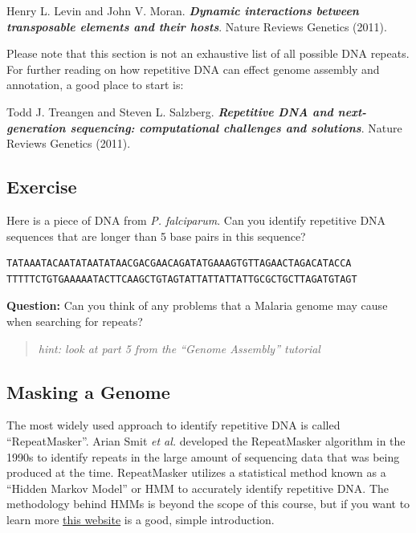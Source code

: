 \documentclass[11pt]{article}
\begin{document}
Henry L. Levin and John V. Moran. \textit{\textbf{Dynamic interactions
between transposable elements and their hosts}}. Nature Reviews Genetics
(2011).

Please note that this section is not an exhaustive list of all possible
DNA repeats. For further reading on how repetitive DNA can effect genome
assembly and annotation, a good place to start is:

Todd J. Treangen and Steven L. Salzberg. \textit{\textbf{Repetitive DNA
and next-generation sequencing: computational challenges and
solutions}}. Nature Reviews Genetics (2011).

    \hypertarget{exercise}{%
\subsection{Exercise}\label{exercise}}

Here is a piece of DNA from \textit{P. falciparum}. Can you identify
repetitive DNA sequences that are longer than 5 base pairs in this
sequence?

\begin{verbatim}
TATAAATACAATATAATATAACGACGAACAGATATGAAAGTGTTAGAACTAGACATACCA
TTTTTCTGTGAAAAATACTTCAAGCTGTAGTATTATTATTATTGCGCTGCTTAGATGTAGT
\end{verbatim}

\textbf{Question:} Can you think of any problems that a Malaria genome
may cause when searching for repeats?

\begin{quote}
\textit{hint: look at part 5 from the ``Genome Assembly'' tutorial}
\end{quote}

    \hypertarget{masking-a-genome}{%
\subsection{Masking a Genome}\label{masking-a-genome}}

The most widely used approach to identify repetitive DNA is called
``RepeatMasker''. Arian Smit \textit{et al.} developed the RepeatMasker
algorithm in the 1990s to identify repeats in the large amount of
sequencing data that was being produced at the time. RepeatMasker
utilizes a statistical method known as a ``Hidden Markov Model'' or HMM
to accurately identify repetitive DNA. The methodology behind HMMs is
beyond the scope of this course, but if you want to learn more
\href{https://towardsdatascience.com/hidden-markov-model-hmm-simple-explanation-in-high-level-b8722fa1a0d5}{this
website} is a good, simple introduction.
\end{document}
